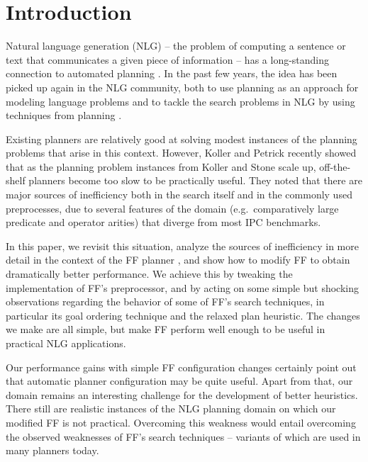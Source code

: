 
\section{Introduction} \label{sec:introduction}

Natural language generation (NLG) -- the problem of computing a
sentence or text that communicates a given piece of information -- has
a long-standing connection to automated planning
\cite{perrault80,appelt:planning}. In the past few years, the idea has
been picked up again in the NLG community, both to use planning as an
approach for modeling language problems
\cite{Steedman-Petrick:07,benotti08b} and to tackle the search
problems in NLG by using techniques from planning \cite{KolSto07}.

Existing planners are relatively good at solving modest instances of
the planning problems that arise in this context. However, Koller and
Petrick 
recently showed that as the planning problem instances from Koller and
Stone  scale up, off-the-shelf planners become too
slow to be practically useful. They noted that there are major sources
of inefficiency both in the search itself and in the commonly used
preprocesses, due to several features of the domain
(e.g.\ comparatively large predicate and operator arities) that
diverge from most IPC benchmarks.

In this paper, we revisit this situation, analyze the sources of
inefficiency in more detail in the context of the FF planner
\cite{HoffmannNebel01}, and show how to modify FF to obtain
dramatically better performance. We achieve this by tweaking the
implementation of FF's preprocessor, and by acting on some simple but
shocking observations regarding the behavior of some of FF's search
techniques, in particular its goal ordering technique and the relaxed
plan heuristic. The changes we make are all simple, but make FF
perform well enough to be useful in practical NLG applications.



Our performance gains with simple FF configuration changes certainly
point out that automatic planner configuration may be quite
useful. Apart from that, our domain remains an interesting challenge
for the development of better heuristics. There still are realistic
instances of the NLG planning domain on which our modified FF is not
practical. Overcoming this weakness would entail overcoming the
observed weaknesses of FF's search techniques -- variants of which are
used in many planners today.



